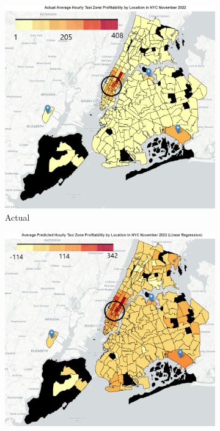 \documentclass[11pt]{article}
\begin{document}
\begin{figure}[h]
\centering
\begin{subfigure}{.36\textwidth}
    \centering
    \includegraphics[width=1\linewidth]{plots/modelling_actual_map_edit.png}  
    \caption{Actual}
    \label{3a}
\end{subfigure}
\begin{subfigure}{.36\textwidth}
    \centering
    \includegraphics[width=1\linewidth]{plots/modelling_map_LR_edit.png}  

\end{subfigure}
\end{figure}
\end{document}
